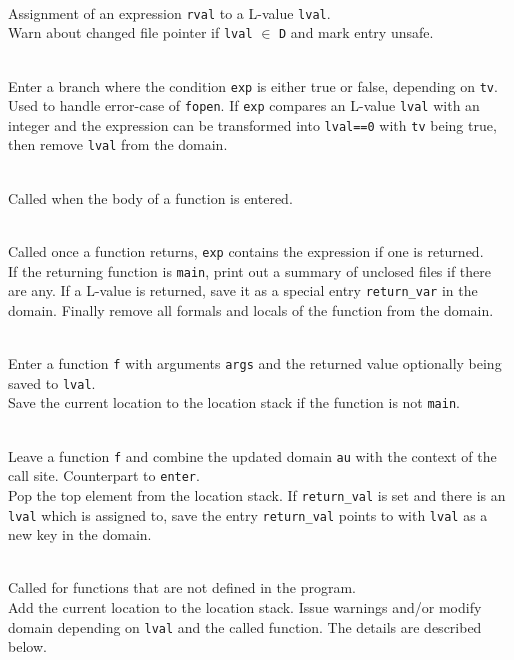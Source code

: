 \begin{description}
\item {}\\
Assignment of an expression \verb|rval| to a L-value \verb|lval|.\\
Warn about changed file pointer if \verb|lval| $\in$ \verb|D| and mark entry unsafe. %

\item {}\\
Enter a branch where the condition \verb|exp| is either true or false, depending on \verb|tv|.\\
Used to handle error-case of \verb|fopen|. If \verb|exp| compares an L-value \verb|lval| with an integer and the expression can be transformed into \verb|lval==0| with \verb|tv| being true, then remove \verb|lval| from the domain.

\item {}\\
Called when the body of a function is entered.

\item {}\\
Called once a function returns, \verb|exp| contains the expression if one is returned.\\
If the returning function is \verb|main|, print out a summary of unclosed files if there are any.
If a L-value is returned, save it as a special entry \verb|return_var| in the domain.
Finally remove all formals and locals of the function from the domain.

\item {}\\
Enter a function \verb|f| with arguments \verb|args| and the returned value optionally being saved to \verb|lval|.\\
Save the current location to the location stack if the function is not \verb|main|.

\item {}\\
Leave a function \verb|f| and combine the updated domain \verb|au| with the context of the call site. Counterpart to \verb|enter|.\\
Pop the top element from the location stack. If \verb|return_val| is set and there is an \verb|lval| which is assigned to, save the entry \verb|return_val| points to with \verb|lval| as a new key in the domain.


\item {}\\
Called for functions that are not defined in the program.\\
Add the current location to the location stack. Issue warnings and/or modify domain depending on \verb|lval| and the called function. The details are described below.
\end{description}


